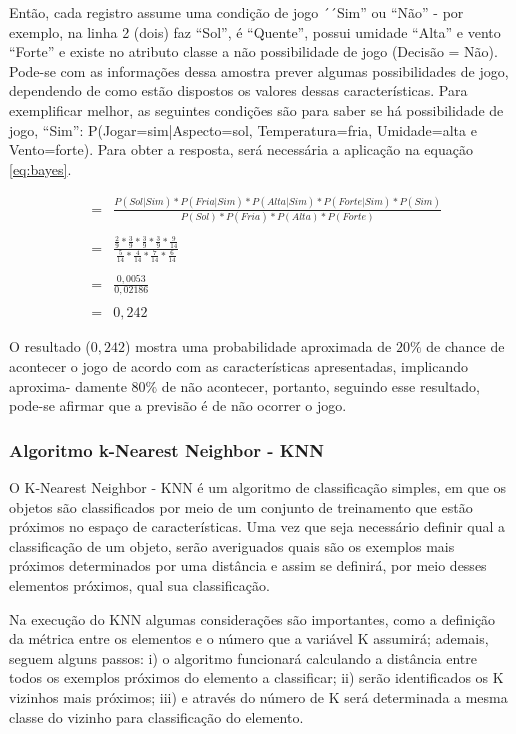 Então, cada registro assume uma condição de jogo ´´Sim'' ou ``Não'' - por exemplo, na linha 2 (dois) faz ``Sol'', é ``Quente'', possui umidade ``Alta'' e vento ``Forte'' e existe no atributo classe a não possibilidade de jogo (Decisão = Não). Pode-se com as informações dessa amostra prever algumas possibilidades de jogo, dependendo de como estão dispostos os valores dessas características. Para exemplificar melhor, as seguintes condições são para saber se há possibilidade de jogo, ``Sim'': P(Jogar=sim|Aspecto=sol, Temperatura=fria, Umidade=alta e Vento=forte). Para obter a resposta, será necessária a aplicação na equação \ref{eq:bayes}.

 


\begin{eqnarray}
&=& \frac{ P(Sol|Sim)*P(Fria|Sim)*P(Alta|Sim)*P(Forte|Sim)*P(Sim) }{ P(Sol)*P(Fria)*P(Alta)*P(Forte) } \nonumber \\ \\
 &=& \frac{ \frac{2}{9}*\frac{3}{9}*\frac{3}{9}*\frac{3}{9}*\frac{9}{14} }{ \frac{5}{14}*\frac{4}{14}*\frac{7}{14}*\frac{6}{14} } \nonumber \\ \\
 &=& \frac{0,0053}{0,02186} \nonumber \\ \\
 &=& 0,242
 \label{eq:resolNB}
\end{eqnarray}

O resultado (${0,242}$) mostra uma probabilidade aproximada de ${20\%}$ de chance de acontecer o jogo de acordo com as características apresentadas, implicando aproxima- damente ${80\%}$ de não acontecer, portanto, seguindo esse resultado, pode-se afirmar que a previsão é de não ocorrer o jogo. 


\subsubsection{Algoritmo k-Nearest Neighbor - KNN}\label{cap:refTeor:sssec:knn}

O K-Nearest Neighbor - KNN é um algoritmo de classificação simples, em que os objetos são classificados por meio de um conjunto de treinamento que estão próximos no espaço de características. Uma vez que seja necessário definir qual a classificação de um objeto, serão averiguados quais são os exemplos mais próximos determinados por uma distância e assim se definirá, por meio desses elementos próximos, qual sua classificação. 

Na execução do KNN algumas considerações são importantes, como a definição da métrica entre os elementos e o número que a variável K assumirá; ademais, seguem alguns passos: i) o algoritmo funcionará calculando a distância entre todos os exemplos próximos do elemento a classificar; ii) serão identificados os K vizinhos mais próximos; iii) e através do número de K será determinada a mesma classe do vizinho para classificação do elemento. 

